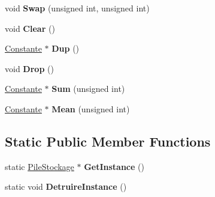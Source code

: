 \begin{DoxyCompactItemize}
\item 
\hypertarget{class_pile_stockage_a8e3387a172e0544ecb8e3415da82ef8a}{void {\bfseries Swap} (unsigned int, unsigned int)}\label{class_pile_stockage_a8e3387a172e0544ecb8e3415da82ef8a}

\item 
\hypertarget{class_pile_stockage_a87982d39f9ff25627c7c2ffdb6105048}{void {\bfseries Clear} ()}\label{class_pile_stockage_a87982d39f9ff25627c7c2ffdb6105048}

\item 
\hypertarget{class_pile_stockage_a651e93d46cf89c8145fd51a664a40dda}{\hyperlink{class_constante}{Constante} $\ast$ {\bfseries Dup} ()}\label{class_pile_stockage_a651e93d46cf89c8145fd51a664a40dda}

\item 
\hypertarget{class_pile_stockage_a26f65a5b14708d44d52167f526cebd67}{void {\bfseries Drop} ()}\label{class_pile_stockage_a26f65a5b14708d44d52167f526cebd67}

\item 
\hypertarget{class_pile_stockage_afa26a3bdd4b29a3559a0710b8ab29eba}{\hyperlink{class_constante}{Constante} $\ast$ {\bfseries Sum} (unsigned int)}\label{class_pile_stockage_afa26a3bdd4b29a3559a0710b8ab29eba}

\item 
\hypertarget{class_pile_stockage_a062111e36b1a30b22ccaa8e5e27d0f61}{\hyperlink{class_constante}{Constante} $\ast$ {\bfseries Mean} (unsigned int)}\label{class_pile_stockage_a062111e36b1a30b22ccaa8e5e27d0f61}

\end{DoxyCompactItemize}
\subsection*{Static Public Member Functions}
\begin{DoxyCompactItemize}
\item 
\hypertarget{class_pile_stockage_a92dca143b503c3e55e4a69ad388db464}{static \hyperlink{class_pile_stockage}{Pile\-Stockage} $\ast$ {\bfseries Get\-Instance} ()}\label{class_pile_stockage_a92dca143b503c3e55e4a69ad388db464}

\item 
\hypertarget{class_pile_stockage_a937a1f84b9ab82192b74d6735f691d90}{static void {\bfseries Detruire\-Instance} ()}\label{class_pile_stockage_a937a1f84b9ab82192b74d6735f691d90}

\end{DoxyCompactItemize}


